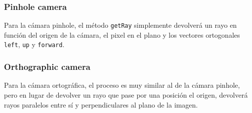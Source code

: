 \documentclass{article}
\begin{document}
\subsubsection{Pinhole camera}
Para la cámara pinhole, el método \texttt{getRay} simplemente devolverá un rayo
en función del origen de la cámara, el pixel en el plano y los vectores
ortogonales \texttt{left}, \texttt{up} y \texttt{forward}.

\subsubsection{Orthographic camera}
Para la cámara ortográfica, el proceso es muy similar al de la cámara pinhole,
pero en lugar de devolver un rayo que pase por una posición el origen, devolverá
rayos paralelos entre sí y perpendiculares al plano de la imagen.
\end{document}
